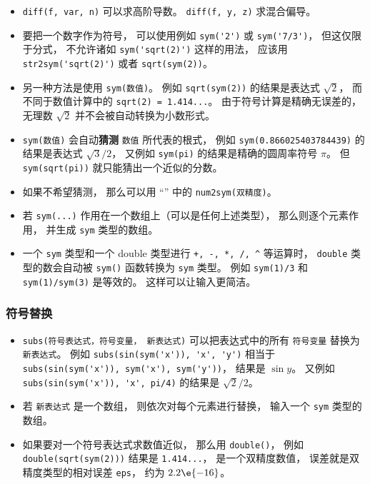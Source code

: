 \begin{itemize}
\item \verb`diff(f, var, n)` 可以求高阶导数。 \verb`diff(f, y, z)` 求混合偏导。

\item  要把一个数字作为符号， 可以使用例如 \verb`sym('2')` 或 \verb`sym('7/3')`， 但这仅限于分式， 不允许诸如 \verb`sym('sqrt(2)')` 这样的用法， 应该用 \verb`str2sym('sqrt(2)')` 或者 \verb`sqrt(sym(2))`。

\item 另一种方法是使用 \verb`sym(数值)`。 例如 \verb`sqrt(sym(2))` 的结果是表达式 $\sqrt 2$， 而不同于数值计算中的 \verb`sqrt(2) = 1.414...`。 由于符号计算是精确无误差的， 无理数 $\sqrt{2}$ 并不会被自动转换为小数形式。

\item  \verb`sym(数值)` 会自动\textbf{猜测} \verb`数值` 所代表的根式， 例如 \verb`sym(0.866025403784439)` 的结果是表达式 $\sqrt{3}/2$， 又例如 \verb`sym(pi)` 的结果是精确的圆周率符号 $\pi$。 但 \verb`sym(sqrt(pi))` 就只能猜出一个近似的分数。

\item 如果不希望猜测， 那么可以用 “” 中的 \verb`num2sym(双精度)`。

\item 若 \verb`sym(...)` 作用在一个数组上（可以是任何上述类型）， 那么则逐个元素作用， 并生成 \verb`sym` 类型的数组。

\item 一个 \verb`sym` 类型和一个 double 类型进行 \verb`+, -, *, /, ^` 等运算时， \verb`double` 类型的数会自动被 \verb`sym()` 函数转换为 \verb`sym` 类型。 例如 \verb`sym(1)/3` 和 \verb`sym(1)/sym(3)` 是等效的。 这样可以让输入更简洁。
\end{itemize}

\subsubsection{符号替换}
\begin{itemize}
\item \verb`subs(符号表达式，符号变量， 新表达式)` 可以把表达式中的所有 \verb`符号变量` 替换为 \verb`新表达式`。 例如 \verb`subs(sin(sym('x')), 'x', 'y')` 相当于 \verb`subs(sin(sym('x')), sym('x'), sym('y'))`， 结果是 $\sin y$。 又例如 \verb`subs(sin(sym('x')), 'x', pi/4)` 的结果是 $\sqrt 2/2$。
\item 若 \verb`新表达式` 是一个数组， 则依次对每个元素进行替换， 输入一个 \verb`sym` 类型的数组。
\item 如果要对一个符号表达式求数值近似， 那么用 \verb`double()`， 例如 \verb`double(sqrt(sym(2)))` 结果是 \verb`1.414...`， 是一个双精度数值， 误差就是双精度类型的相对误差 \verb`eps`， 约为 $2.2\e{-16}$。
\end{itemize}

